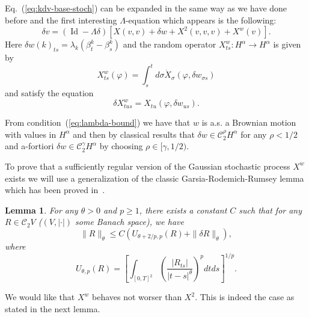 \documentclass[a4paper,12pt,reqno]{article}
\newcommand{\der}{\delta}
\newcommand{\CC}{\mathcal{C}}
\DeclareMathOperator{\id}{\text{Id}}
\newtheorem{lemma}[theorem]{Lemma}
\begin{document}
Eq.~(\ref{eq:kdv-base-stoch}) can be expanded in the same
way as we have done before and the first
interesting $\Lambda$-equation which appears is the following:
\begin{equation}
  \label{eq:lambda-eq-stoch}
  \der v = (\id-\Lambda\der)[X(v,v) + \der w + X^{2}(v,v,v) + X^{w}(v)].
\end{equation}
Here $\der w(k)_{ts} = \lambda_k (\beta^k_t-\beta^k_s)$ and  the
random operator $X^w_{ts}: H^\alpha\to H^\alpha$ is given by
\begin{equation}
  \label{eq:Xw}
  X^w_{ts}(\varphi) = \int_s^t d\sigma \dot X_\sigma(\varphi, \der
  w_{\sigma s})
\end{equation}
and satisfy the equation
\begin{equation}
  \label{eq:deltaXw}
  \der X^w_{tus} = X_{tu}(\varphi,\der w_{us}).
\end{equation}

From condition~(\ref{eq:lambda-bound}) we have that $w$ is a.s. a Brownian
motion with values in $H^{\alpha}$ and then by classical results that $\der w \in
\CC^{\rho}_2 H^\alpha$ for any $\rho < 1/2$ and a-fortiori $\der w \in
\CC^{\gamma}_2 H^\alpha$ by choosing $\rho \in [\gamma,1/2)$. 

To prove that a sufficiently regular version of the Gaussian stochastic process $X^w$ exists
we will use a generalization of the classic Garsia-Rodemich-Rumsey lemma
which has been proved in~\cite{MR2091358}.
\begin{lemma}
\label{lemma:besov}
For any $\theta > 0$ and $p \ge 1$,  there exists a constant
$C$ such that for any $R \in \CC_{2} V$ ($(V,|\cdot|)$ some Banach space), we have 
\begin{equation}
\label{eq:generalboundxx}
\|R\|_{\theta} \le C (U_{\theta+2/p,p}(R)+\|\der R\|_{\theta}),
\end{equation}
where
\begin{equation*}
 U_{\theta,p}(R) = \left[ \int_{[0,T]^2}
 \left(\frac{|R_{t s}|}{|t-s|^\theta}\right)^p dt ds \right]^{1/p}.
\end{equation*}
\end{lemma}

We would like that $X^w$ behaves not worser than $X^2$. 
This is indeed the case as stated in the next lemma.
\end{document}
